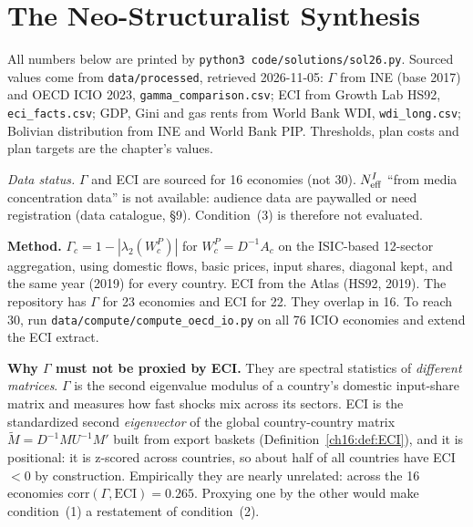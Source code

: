 \documentclass[../solutions_manual.tex]{subfiles}
\begin{document}
\ifSubfilesClassLoaded{\setcounter{chapter}{25}}{}%
\setcounter{chapter}{25}%
\chapter{The Neo-Structuralist Synthesis}\label{sol26}
\begingroup\sloppy

All numbers below are printed by \texttt{python3 code/solutions/sol26.py}. Sourced values come from \texttt{data/processed}, retrieved 2026-11-05: $\Gamma$ from INE (base 2017) and OECD ICIO 2023, \texttt{gamma\_comparison.csv}; ECI from Growth Lab HS92, \texttt{eci\_facts.csv}; GDP, Gini and gas rents from World Bank WDI, \texttt{wdi\_long.csv}; Bolivian distribution from INE and World Bank PIP. Thresholds, plan costs and plan targets are the chapter's \illustrative{} values.


\emph{Data status.} $\Gamma$ and ECI are sourced for 16 economies (not 30). $N_{\text{eff}}^I$ ``from media concentration data'' is not available: audience data are paywalled or need registration (data catalogue, \S9). Condition~(3) is therefore not evaluated.

 \textbf{Method.} $\Gamma_c = 1 - |\lambda_2(W^P_c)|$ for $W^P_c = D^{-1}A_c$ on the ISIC-based 12-sector aggregation, using domestic flows, basic prices, input shares, diagonal kept, and the same year (2019) for every country. ECI from the Atlas (HS92, 2019). The repository has $\Gamma$ for 23 economies and ECI for 22. They overlap in 16. To reach 30, run \texttt{data/compute/compute\_oecd\_io.py} on all 76 ICIO economies and extend the ECI extract.

 \textbf{Why $\Gamma$ must not be proxied by ECI.} They are spectral statistics of \emph{different matrices}. $\Gamma$ is the second eigenvalue modulus of a country's domestic input-share matrix and measures how fast shocks mix across its sectors. ECI is the standardized second \emph{eigenvector} of the global country-country matrix $\tilde M = D^{-1}MU^{-1}M'$ built from export baskets (Definition~\ref{ch16:def:ECI}), and it is positional: it is z-scored across countries, so about half of all countries have ECI $< 0$ by construction. Empirically they are nearly unrelated: across the 16 economies $\text{corr}(\Gamma, \text{ECI}) = 0.265$. Proxying one by the other would make condition~(1) a restatement of condition~(2).
\end{document}
